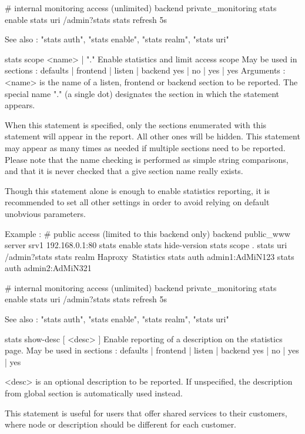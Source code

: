     # internal monitoring access (unlimited)
    backend private_monitoring
        stats enable
        stats uri     /admin?stats
        stats refresh 5s

  See also : "stats auth", "stats enable", "stats realm", "stats uri"


stats scope { <name> | "." }
  Enable statistics and limit access scope
  May be used in sections :   defaults | frontend | listen | backend
                                 yes   |    no    |   yes  |   yes
  Arguments :
    <name>    is the name of a listen, frontend or backend section to be
              reported. The special name "." (a single dot) designates the
              section in which the statement appears.

  When this statement is specified, only the sections enumerated with this
  statement will appear in the report. All other ones will be hidden. This
  statement may appear as many times as needed if multiple sections need to be
  reported. Please note that the name checking is performed as simple string
  comparisons, and that it is never checked that a give section name really
  exists.

  Though this statement alone is enough to enable statistics reporting, it is
  recommended to set all other settings in order to avoid relying on default
  unobvious parameters.

  Example :
    # public access (limited to this backend only)
    backend public_www
        server srv1 192.168.0.1:80
        stats enable
        stats hide-version
        stats scope   .
        stats uri     /admin?stats
        stats realm   Haproxy\ Statistics
        stats auth    admin1:AdMiN123
        stats auth    admin2:AdMiN321

    # internal monitoring access (unlimited)
    backend private_monitoring
        stats enable
        stats uri     /admin?stats
        stats refresh 5s

  See also : "stats auth", "stats enable", "stats realm", "stats uri"


stats show-desc [ <desc> ]
  Enable reporting of a description on the statistics page.
  May be used in sections :   defaults | frontend | listen | backend
                                 yes   |    no    |   yes  |   yes

    <desc>    is an optional description to be reported. If unspecified, the
              description from global section is automatically used instead.

  This statement is useful for users that offer shared services to their
  customers, where node or description should be different for each customer.

